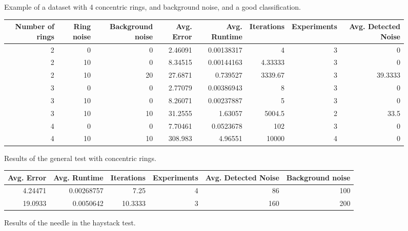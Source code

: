\documentclass[conference]{IEEEtran}
\begin{document}
\begin{figure}[H]
    \centering
    \resizebox{0.9\linewidth}{!}{}
    \label{fig:concentric_rings}
    \caption{Example of a dataset with 4 concentric rings, and background noise, and a good classification.}
\end{figure}

\begin{figure*}[!ht]
\centering
\begin{tabular}{rrrrrrrr}
    \hline
       Number of rings &   Ring noise &   Background noise &   Avg. Error &   Avg. Runtime &   Iterations &   Experiments &   Avg. Detected Noise \\
    \hline
                     2 &            0 &                  0 &      2.46091 &     0.00138317 &      4       &             3 &                0      \\
                     2 &           10 &                  0 &      8.34515 &     0.00144163 &      4.33333 &             3 &                0      \\
                     2 &           10 &                 20 &     27.6871  &     0.739527   &   3339.67    &             3 &               39.3333 \\
                     3 &            0 &                  0 &      2.77079 &     0.00386943 &      8       &             3 &                0      \\
                     3 &           10 &                  0 &      8.26071 &     0.00237887 &      5       &             3 &                0      \\
                     3 &           10 &                 10 &     31.2555  &     1.63057    &   5004.5     &             2 &               33.5    \\
                     4 &            0 &                  0 &      7.70461 &     0.0523678  &    102       &             3 &                0      \\
                     4 &           10 &                 10 &    308.983   &     4.96551    &  10000       &             4 &                0      \\
    \hline
\end{tabular}
\caption{Results of the general test with concentric rings.}
\end{figure*}
\begin{figure*}[!ht]
    \centering
    \begin{tabular}{rrrrrr}
        \hline
           Avg. Error &   Avg. Runtime &   Iterations &   Experiments &   Avg. Detected Noise &   Background noise \\
        \hline
              4.24471 &     0.00268757 &       7.25   &             4 &                    86 &                100 \\
             19.0933  &     0.0050642  &      10.3333 &             3 &                   160 &                200 \\
        \hline
        \end{tabular}
    \caption{Results of the needle in the haystack test.}
\end{figure*}
\end{document}
